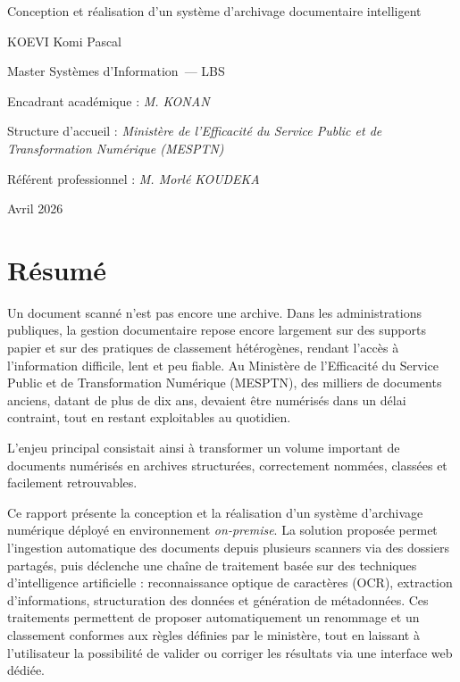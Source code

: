 \documentclass[12pt,a4paper]{report}
\title{\rapportTitre}
\author{\parbox{0.95\textwidth}{\centering
  \auteurNom\\
  \formation --- \universite\\
  \directeurMemoire\\
  \structureAccueil\\
  \tuteurStage
}}
\date{Avril 2026}
\newcommand{\rapportTitre}{Conception et réalisation d’un système d’archivage documentaire intelligent}
\newcommand{\auteurNom}{KOEVI Komi Pascal}
\newcommand{\formation}{Master Systèmes d’Information}
\newcommand{\universite}{LBS}
\newcommand{\nomMinistere}{Ministère de l'Efficacité du Service Public et de Transformation Numérique (MESPTN)}
\newcommand{\directeurMemoire}{Encadrant académique : \textit{M. KONAN}}
\newcommand{\structureAccueil}{Structure d’accueil : \textit{\nomMinistere}}
\newcommand{\tuteurStage}{Référent professionnel : \textit{M. Morlé KOUDEKA}}
\begin{document}
\begin{titlepage}
  \thispagestyle{empty}
  \centering
  \vspace*{2.5cm}
  {\LARGE \rapportTitre\par}
  \vspace{2.2cm}

  {\large \auteurNom\par}
  \vspace{0.3cm}
  {\formation\ --- \universite\par}
  \vspace{0.8cm}

  {\directeurMemoire\par}
  {\structureAccueil\par}
  {\tuteurStage\par}

  \vfill
  {Avril 2026\par}
\end{titlepage}

\setcounter{page}{1}

\listoffigures

\clearpage
\tableofcontents
\clearpage

\chapter*{Résumé}
Un document scanné n’est pas encore une archive. Dans les administrations publiques, la gestion documentaire repose encore largement sur des supports papier et sur des pratiques de classement hétérogènes, rendant l’accès à l’information difficile, lent et peu fiable. Au \nomMinistere{}, des milliers de documents anciens, datant de plus de dix ans, devaient être numérisés dans un délai contraint, tout en restant exploitables au quotidien.

L’enjeu principal consistait ainsi à transformer un volume important de documents numérisés en archives structurées, correctement nommées, classées et facilement retrouvables.

Ce rapport présente la conception et la réalisation d’un système d’archivage numérique déployé en environnement \textit{on-premise}. La solution proposée permet l’ingestion automatique des documents depuis plusieurs scanners via des dossiers partagés, puis déclenche une chaîne de traitement basée sur des techniques d’intelligence artificielle : reconnaissance optique de caractères (OCR), extraction d’informations, structuration des données et génération de métadonnées. Ces traitements permettent de proposer automatiquement un renommage et un classement conformes aux règles définies par le ministère, tout en laissant à l’utilisateur la possibilité de valider ou corriger les résultats via une interface web dédiée.
\end{document}
